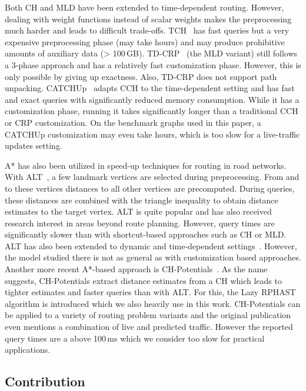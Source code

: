 \documentclass[a4paper,UKenglish,cleveref, autoref, thm-restate]{lipics-v2021}
\begin{document}
Both CH and MLD have been extended to time-dependent routing.
However, dealing with weight functions instead of scalar weights makes the preprocessing much harder and leads to difficult trade-offs.
TCH~\cite{bgsv-mtdtt-13} has fast queries but a very expensive preprocessing phase (may take hours) and may produce prohibitive amounts of auxiliary data (> 100\,GB).
TD-CRP~\cite{bdpw-dtdrp-16} (the MLD variant) still follows a 3-phase approach and has a relatively fast customization phase.
However, this is only possible by giving up exactness.
Also, TD-CRP does not support path unpacking.
CATCHUp~\cite{swz-sfert-21} adapts CCH to the time-dependent setting and has fast and exact queries with significantly reduced memory consumption.
While it has a customization phase, running it takes significantly longer than a traditional CCH or CRP customization.
On the benchmark graphs used in this paper, a CATCHUp customization may even take hours, which is too slow for a live-traffic updates setting.

A* has also been utilized in speed-up techniques for routing in road networks.
With ALT~\cite{gh-cspas-05,gw-cppsp-05}, a few landmark vertices are selected during preprocessing.
From and to these vertices distances to all other vertices are precomputed.
During queries, these distances are combined with the triangle inequality to obtain distance estimates to the target vertex.
ALT is quite popular and has also received research interest in areas beyond route planning.
However, query times are significantly slower than with shortcut-based approaches such as CH or MLD.
ALT has also been extended to dynamic and time-dependent settings~\cite{dn-crdtd-12}. %
However, the model studied there is not as general as with customization based approaches.
Another more recent A*-based approach is CH-Potentials~\cite{strasser_et_al:LIPIcs.SEA.2021.6}.
As the name suggests, CH-Potentials extract distance estimates from a CH which leads to tighter estimates and faster queries than with ALT.
For this, the Lazy RPHAST algorithm is introduced which we also heavily use in this work.
CH-Potentials can be applied to a variety of routing problem variants and the original publication even mentions a combination of live and predicted traffic.
However the reported query times are a above 100\,ms which we consider too slow for practical applications.

\subsection{Contribution}
\end{document}
